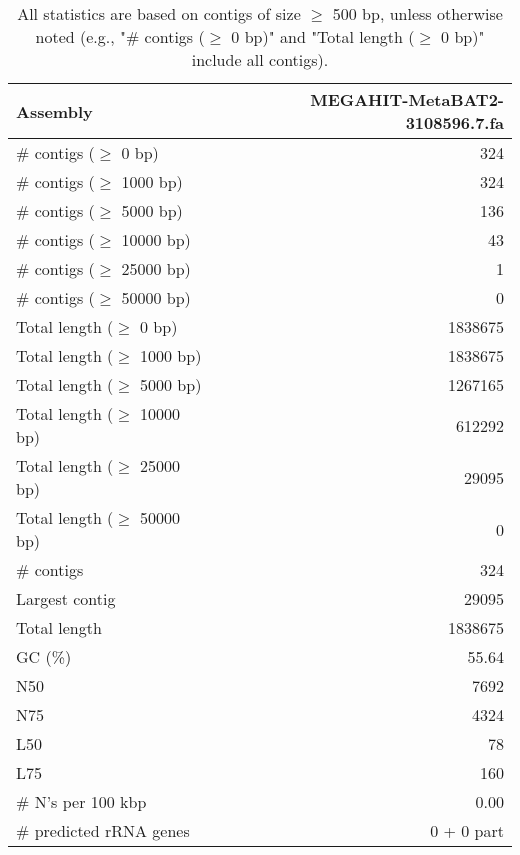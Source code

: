 \documentclass[12pt,a4paper]{article}
\begin{document}
\begin{table}[ht]
\begin{center}
\caption{All statistics are based on contigs of size $\geq$ 500 bp, unless otherwise noted (e.g., "\# contigs ($\geq$ 0 bp)" and "Total length ($\geq$ 0 bp)" include all contigs).}
\begin{tabular}{|l*{1}{|r}|}
\hline
Assembly & MEGAHIT-MetaBAT2-3108596.7.fa \\ \hline
\# contigs ($\geq$ 0 bp) & 324 \\ \hline
\# contigs ($\geq$ 1000 bp) & 324 \\ \hline
\# contigs ($\geq$ 5000 bp) & 136 \\ \hline
\# contigs ($\geq$ 10000 bp) & 43 \\ \hline
\# contigs ($\geq$ 25000 bp) & 1 \\ \hline
\# contigs ($\geq$ 50000 bp) & 0 \\ \hline
Total length ($\geq$ 0 bp) & 1838675 \\ \hline
Total length ($\geq$ 1000 bp) & 1838675 \\ \hline
Total length ($\geq$ 5000 bp) & 1267165 \\ \hline
Total length ($\geq$ 10000 bp) & 612292 \\ \hline
Total length ($\geq$ 25000 bp) & 29095 \\ \hline
Total length ($\geq$ 50000 bp) & 0 \\ \hline
\# contigs & 324 \\ \hline
Largest contig & 29095 \\ \hline
Total length & 1838675 \\ \hline
GC (\%) & 55.64 \\ \hline
N50 & 7692 \\ \hline
N75 & 4324 \\ \hline
L50 & 78 \\ \hline
L75 & 160 \\ \hline
\# N's per 100 kbp & 0.00 \\ \hline
\# predicted rRNA genes & 0 + 0 part \\ \hline
\end{tabular}
\end{center}
\end{table}
\end{document}
